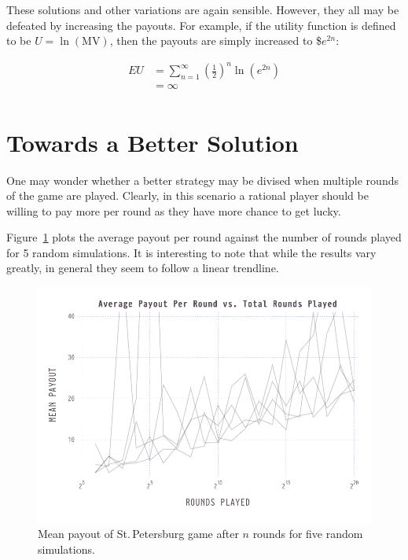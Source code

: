 \documentclass[11pt]{article}
\begin{document}
These solutions and other variations are again sensible. However, they all may be defeated by increasing the payouts. For example, if the utility function is defined to be $U=\ln(\mathrm{MV})$, then the payouts are simply increased to \$$e^{2n}$:

\begin{align*}
  EU &= \sum_{n=1}^{\infty}\left(\frac{1}{2}\right)^n\ln\left(e^{2n}\right) \\
     &= \infty \\
\end{align*}


\section{Towards a Better Solution}

One may wonder whether a better strategy may be divised when multiple rounds of the game are played. Clearly, in this scenario a rational player should be willing to pay more per round as they have more chance to get lucky.

Figure~\ref{fig:average-over-time} plots the average payout per round against the number of rounds played for 5 random simulations. It is interesting to note that while the results vary greatly, in general they seem to follow a linear trendline.

\begin{figure}
  \centering
  \includegraphics[width=\textwidth]{average-over-time}
  \caption{Mean payout of St.\,Petersburg game after $n$ rounds for five random simulations.}
  \label{fig:average-over-time}
\end{figure}
\end{document}
